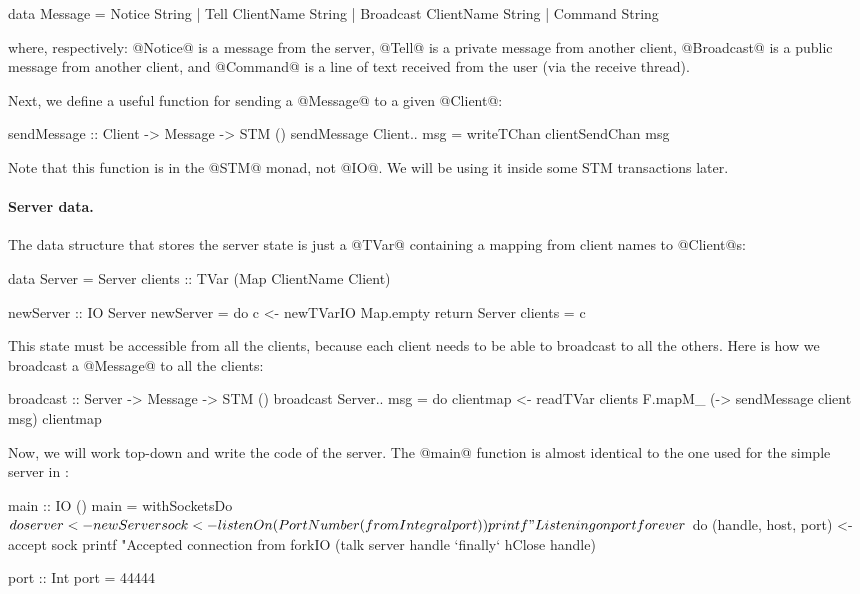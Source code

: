\begin{haskell}
data Message = Notice String
             | Tell ClientName String
             | Broadcast ClientName String
             | Command String
\end{haskell}

\noindent where, respectively: @Notice@ is a message from the server,
@Tell@ is a private message from another client, @Broadcast@ is a
public message from another client, and @Command@ is a line of text
received from the user (via the receive thread).

Next, we define a useful function for sending a @Message@ to a given
@Client@:

\begin{haskell}
sendMessage :: Client -> Message -> STM ()
sendMessage Client{..} msg =
    writeTChan clientSendChan msg
\end{haskell}

\noindent Note that this function is in the @STM@ monad, not @IO@.  We
will be using it inside some STM transactions later.

\paragraph{Server data.} The data structure that stores the server state is just a @TVar@
containing a mapping from client names to @Client@s:

\begin{haskell}
data Server = Server
  { clients :: TVar (Map ClientName Client)
  }

newServer :: IO Server
newServer = do
  c <- newTVarIO Map.empty
  return Server { clients = c }
\end{haskell}

This state must be accessible from all the clients, because each
client needs to be able to broadcast to all the others.  Here is how
we broadcast a @Message@ to all the clients:

\begin{haskell}
broadcast :: Server -> Message -> STM ()
broadcast Server{..} msg = do
    clientmap <- readTVar clients
    F.mapM_ (\client -> sendMessage client msg) clientmap
\end{haskell}

Now, we will work top-down and write the code of the server.  The
@main@ function is almost identical to the one used for the simple
server in :

\begin{haskell}
main :: IO ()
main = withSocketsDo $ do
  server <- newServer
  sock <- listenOn (PortNumber (fromIntegral port))
  printf "Listening on port %
  forever $ do
      (handle, host, port) <- accept sock
      printf "Accepted connection from %
      forkIO (talk server handle `finally` hClose handle)

port :: Int
port = 44444
\end{haskell}

